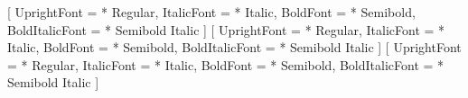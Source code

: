 \newif\ifnotlatexml
\ifdefined\latexml
  \notlatexmlfalse
\else
  \notlatexmltrue
\fi

\usepackage[left=1.25in, right=1.25in, top=1in, bottom=1.15in]{geometry}

\ifnotlatexml
\usepackage{fontspec}
\setmainfont{Source Serif 4}[
    UprightFont = * Regular,
    ItalicFont = * Italic,
    BoldFont = * Semibold,
    BoldItalicFont = * Semibold Italic
]
\setsansfont{Source Sans 3}[
    UprightFont = * Regular,
    ItalicFont = * Italic,
    BoldFont = * Semibold,
    BoldItalicFont = * Semibold Italic
]
\setmonofont{Source Code Pro}[
  UprightFont = * Regular,
  ItalicFont = * Italic,
  BoldFont = * Semibold,
  BoldItalicFont = * Semibold Italic
]
\fi

\ifnotlatexml
\usepackage{microtype}
\fi

\usepackage{setspace}
\setlength{\parindent}{0pt}
\setlength{\parskip}{6pt plus 2pt minus 1pt}


\makeatletter
\g@addto@macro\@afterheading{\vspace{-\parskip}}
\makeatother

\usepackage{etoolbox}

\usepackage{xcolor}


\definecolor{schoolcolorprimary}{HTML}{\brandhexprimary}

